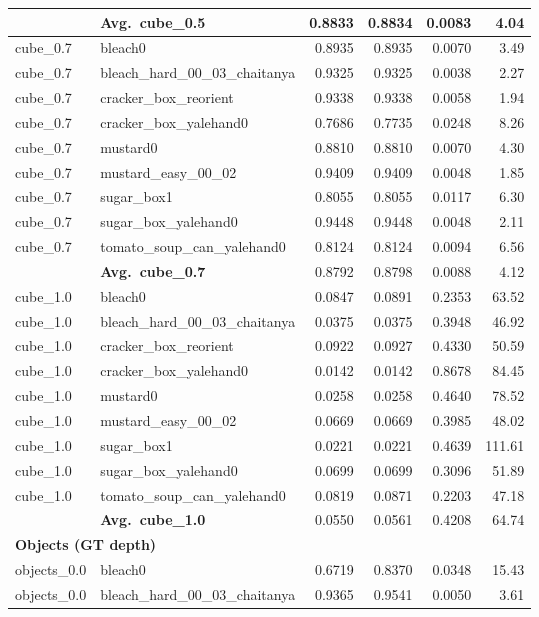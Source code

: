 \begin{longtable}{llrrrr}
  & \textbf{Avg.~cube_0.5} & 0.8833 & 0.8834 & 0.0083 & 4.04 \\
  \midrule
  cube_0.7 & bleach0 & 0.8935 & 0.8935 & 0.0070 & 3.49 \\
  cube_0.7 & bleach\_hard\_00\_03\_chaitanya & 0.9325 & 0.9325 & 0.0038 & 2.27 \\
  cube_0.7 & cracker\_box\_reorient & 0.9338 & 0.9338 & 0.0058 & 1.94 \\
  cube_0.7 & cracker\_box\_yalehand0 & 0.7686 & 0.7735 & 0.0248 & 8.26 \\
  cube_0.7 & mustard0 & 0.8810 & 0.8810 & 0.0070 & 4.30 \\
  cube_0.7 & mustard\_easy\_00\_02 & 0.9409 & 0.9409 & 0.0048 & 1.85 \\
  cube_0.7 & sugar\_box1 & 0.8055 & 0.8055 & 0.0117 & 6.30 \\
  cube_0.7 & sugar\_box\_yalehand0 & 0.9448 & 0.9448 & 0.0048 & 2.11 \\
  cube_0.7 & tomato\_soup\_can\_yalehand0 & 0.8124 & 0.8124 & 0.0094 & 6.56 \\
  \cmidrule{2-6}
  & \textbf{Avg.~cube_0.7} & 0.8792 & 0.8798 & 0.0088 & 4.12 \\
  \midrule
  cube_1.0 & bleach0 & 0.0847 & 0.0891 & 0.2353 & 63.52 \\
  cube_1.0 & bleach\_hard\_00\_03\_chaitanya & 0.0375 & 0.0375 & 0.3948 & 46.92 \\
  cube_1.0 & cracker\_box\_reorient & 0.0922 & 0.0927 & 0.4330 & 50.59 \\
  cube_1.0 & cracker\_box\_yalehand0 & 0.0142 & 0.0142 & 0.8678 & 84.45 \\
  cube_1.0 & mustard0 & 0.0258 & 0.0258 & 0.4640 & 78.52 \\
  cube_1.0 & mustard\_easy\_00\_02 & 0.0669 & 0.0669 & 0.3985 & 48.02 \\
  cube_1.0 & sugar\_box1 & 0.0221 & 0.0221 & 0.4639 & 111.61 \\
  cube_1.0 & sugar\_box\_yalehand0 & 0.0699 & 0.0699 & 0.3096 & 51.89 \\
  cube_1.0 & tomato\_soup\_can\_yalehand0 & 0.0819 & 0.0871 & 0.2203 & 47.18 \\
  \cmidrule{2-6}
  & \textbf{Avg.~cube_1.0} & 0.0550 & 0.0561 & 0.4208 & 64.74 \\
  \midrule
\multicolumn{6}{l}{\textbf{Objects (GT depth)}} \\
\midrule
  objects_0.0 & bleach0 & 0.6719 & 0.8370 & 0.0348 & 15.43 \\
  objects_0.0 & bleach\_hard\_00\_03\_chaitanya & 0.9365 & 0.9541 & 0.0050 & 3.61 \\

\end{longtable}
